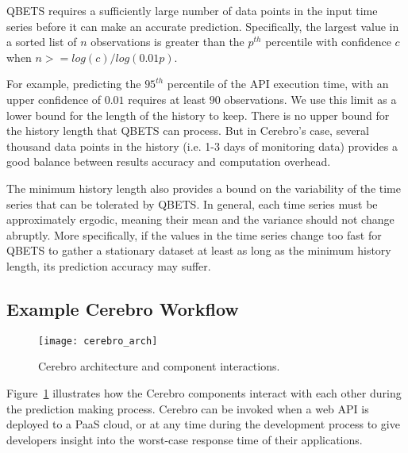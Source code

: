 QBETS requires a sufficiently large number of data points
in the input time series before it can make an accurate prediction. 
Specifically, the largest value in a sorted list of $n$ observations is
greater than the $p^{th}$ percentile with confidence $c$ when $n >=
log(c)/log(0.01p)$.

For example, predicting the $95^{th}$ percentile
of the API execution time, with an upper confidence of $0.01$ requires at
least $90$ observations. We use this limit as a lower bound for the length
of the history to keep. There is no upper bound for the history length
that QBETS can process. But in Cerebro's case, several thousand data points
in the history (i.e. 1-3 days of monitoring data) provides a good balance between
results accuracy and computation overhead.

The minimum history length also provides a bound on the variability of the
time series that can be tolerated by QBETS. In general, each time series must be
approximately ergodic, meaning their mean and the variance should not change abruptly.
More specifically, if the values in the time series change too fast for QBETS to gather
a stationary dataset at least as long as the minimum history length, its prediction 
accuracy may suffer.

\subsection{Example Cerebro Workflow}

\begin{figure}
\centering
\texttt{[image: cerebro\_arch]}
\caption{Cerebro architecture and component interactions.}
\label{fig:cerebro_arch}
\end{figure}

Figure~\ref{fig:cerebro_arch} illustrates how the Cerebro components interact with
each other during the prediction making process.  Cerebro can be
invoked when a web API is deployed to a PaaS cloud, or at any time during the development
process to give developers insight into the worst-case response time of their
applications.

